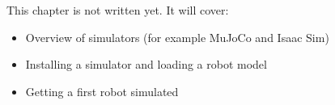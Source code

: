 \label{ch:k1sim}
\begin{keyidea}
This chapter is not written yet. It will cover:
\begin{itemize}[nosep]
  \item Overview of simulators (for example MuJoCo and Isaac Sim)
  \item Installing a simulator and loading a robot model
  \item Getting a first robot simulated
\end{itemize}
\end{keyidea}
